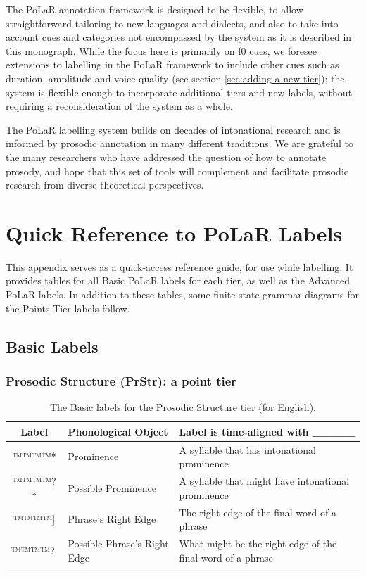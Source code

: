 \documentclass[11pt, twoside]{memoir}
\begin{document}
The PoLaR annotation framework is designed to be flexible, to allow straightforward tailoring to new languages and dialects, and also to take into account cues and categories not encompassed by the system as it is described in this monograph. While the focus here is primarily on f0 cues, we foresee extensions to labelling in the PoLaR framework to include other cues such as duration, amplitude and voice quality (see section \ref{sec:adding-a-new-tier}); the system is flexible enough to incorporate additional tiers and new labels, without requiring a reconsideration of the system as a whole.

The PoLaR labelling system builds on decades of intonational research and is informed by prosodic annotation in many different traditions. We are grateful to the many researchers who have addressed the question of how to annotate prosody, and hope that this set of tools will complement and facilitate prosodic research from diverse theoretical perspectives.





\appendix
\chapter{Quick Reference to PoLaR Labels}\label{sec:polar-quick-reference-to-labels}

This appendix serves as a quick-access reference guide, for use while labelling. It provides tables for all Basic PoLaR labels for each tier, as well as the Advanced PoLaR labels. In addition to these tables, some finite state grammar diagrams for the Points Tier labels follow.


\section*{Basic Labels}

\subsection*{Prosodic Structure (PrStr): a point tier}
\begin{longtable}{clp{.525\linewidth}} \toprule \textbf{Label} & \textbf{Phonological Object} & \textbf{Label is time-aligned with \_\_\_\_\_}\tabularnewline
\midrule \endhead
™™™™{*} & Prominence & A syllable that has intonational prominence \tabularnewline
™™™™{?*} & Possible Prominence & A syllable that might have intonational prominence \tabularnewline
™™™™{]} & Phrase’s Right Edge & The right edge of the final word of a phrase \tabularnewline
™™™™{?]} & Possible Phrase’s Right Edge & What might be the right edge of the final word of a phrase \tabularnewline
\bottomrule 
\caption{The Basic labels for the Prosodic Structure tier (for English).%
}
\end{longtable}
\end{document}
